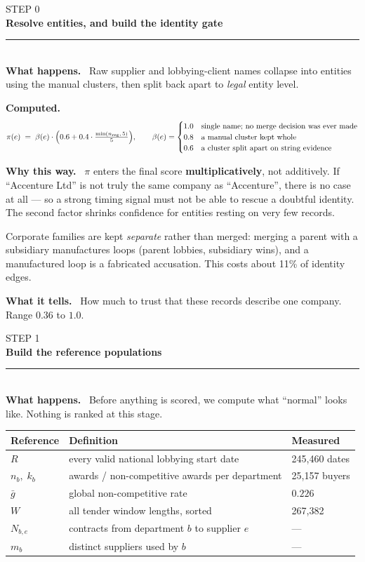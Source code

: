 \documentclass[11pt,a4paper]{article}
\newcommand{\stephead}[2]{%
  \vspace{1.1em}\noindent
  {\color{slate}\ttfamily\footnotesize STEP #1}\\[-0.15em]
  {\large\bfseries\color{pine} #2}\\[0.25em]
  {\color{rulec}\rule{\linewidth}{0.6pt}}\\[0.3em]}
\newcommand{\field}[1]{\smallskip\noindent\textbf{#1}\ }
\begin{document}
\stephead{0}{Resolve entities, and build the identity gate}

\field{What happens.}
Raw supplier and lobbying-client names collapse into entities using the manual clusters,
then split back apart to \emph{legal} entity level.

\field{Computed.}
\[
\pi(e) \;=\; \beta(e)\cdot\Bigl(0.6 + 0.4\cdot\tfrac{\min(n_{\mathrm{reg}},\,5)}{5}\Bigr),
\qquad
\beta(e)=\begin{cases}
1.0 & \text{single name; no merge decision was ever made}\\
0.8 & \text{a manual cluster kept whole}\\
0.6 & \text{a cluster split apart on string evidence}
\end{cases}
\]

\field{Why this way.}
$\pi$ enters the final score \textbf{multiplicatively}, not additively. If
``Accenture Ltd'' is not truly the same company as ``Accenture'', there is no case at
all --- so a strong timing signal must not be able to rescue a doubtful identity. The
second factor shrinks confidence for entities resting on very few records.

Corporate families are kept \emph{separate} rather than merged: merging a parent with a
subsidiary manufactures loops (parent lobbies, subsidiary wins), and a manufactured loop
is a fabricated accusation. This costs about 11\% of identity edges.

\field{What it tells.} How much to trust that these records describe one company.
Range $0.36$ to $1.0$.

\stephead{1}{Build the reference populations}

\field{What happens.} Before anything is scored, we compute what ``normal'' looks like.
Nothing is ranked at this stage.

\begin{center}\small
\begin{tabular}{@{}lll@{}}
\toprule
\textbf{Reference} & \textbf{Definition} & \textbf{Measured} \\
\midrule
$R$ & every valid national lobbying start date & 245{,}460 dates \\
$n_b,\;k_b$ & awards / non-competitive awards per department & 25{,}157 buyers \\
$\bar{g}$ & global non-competitive rate & $0.226$ \\
$W$ & all tender window lengths, sorted & 267{,}382 \\
$N_{b,e}$ & contracts from department $b$ to supplier $e$ & --- \\
$m_b$ & distinct suppliers used by $b$ & --- \\
\bottomrule
\end{tabular}
\end{center}
\end{document}
